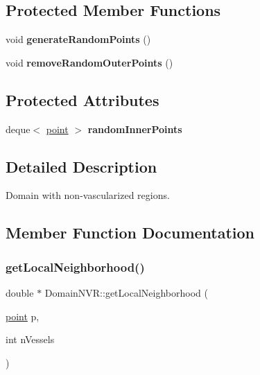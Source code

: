 \subsection*{Protected Member Functions}
\begin{DoxyCompactItemize}
\item 
\mbox{\label{class_domain_n_v_r_a7bcd43488a6810609d6004653d36566f}} 
void {\bfseries generate\+Random\+Points} ()
\item 
\mbox{\label{class_domain_n_v_r_aae7ebe5baaefe6824097127c8d91bb2c}} 
void {\bfseries remove\+Random\+Outer\+Points} ()
\end{DoxyCompactItemize}
\subsection*{Protected Attributes}
\begin{DoxyCompactItemize}
\item 
\mbox{\label{class_domain_n_v_r_a8fbb161c35df4d674c42fcf0baa76284}} 
deque$<$ \mbox{\hyperlink{structpoint}{point}} $>$ {\bfseries random\+Inner\+Points}
\end{DoxyCompactItemize}


\subsection{Detailed Description}
Domain with non-\/vascularized regions. 

\subsection{Member Function Documentation}
\mbox{\label{class_domain_n_v_r_a400dcad443d14d5eee1938621689e4c7}} 
\subsubsection{\texorpdfstring{get\+Local\+Neighborhood()}{getLocalNeighborhood()}}
{\footnotesize\ttfamily double $\ast$ Domain\+N\+V\+R\+::get\+Local\+Neighborhood (\begin{DoxyParamCaption}\item[{\mbox{\hyperlink{structpoint}{point}}}]{p,  }\item[{int}]{n\+Vessels }\end{DoxyParamCaption})\hspace{0.3cm}{\ttfamily [virtual]}}

